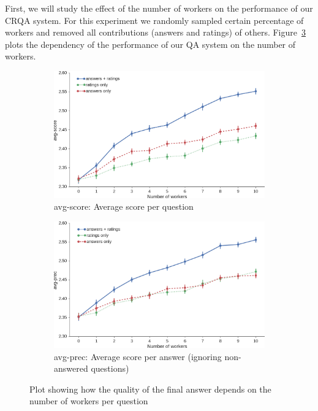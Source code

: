 \documentclass[letterpaper]{article}
\begin{document}
First, we will study the effect of the number of workers on the performance of our CRQA system.
For this experiment we randomly sampled certain percentage of workers and removed all contributions (answers and ratings) of others.
Figure~\ref{fig:nworkers_vs_quality} plots the dependency of the performance of our QA system on the number of workers.

\begin{figure}[h!t]
  \begin{subfigure}[t]{0.48\textwidth}
	\centering
	\includegraphics[width=\textwidth]{img/nworkers_vs_accuracy}
	\caption{avg-score: Average score per question}
	\label{fig:nworkers_vs_accuracy}
  \end{subfigure}
  \begin{subfigure}[t]{0.48\textwidth}
	\centering
	\includegraphics[width=\textwidth]{img/nworkers_vs_precision}
	\caption{avg-prec: Average score per answer (ignoring non-answered questions)}
	\label{fig:nworkers_vs_precision}
  \end{subfigure}
	\caption{Plot showing how the quality of the final answer depends on the number of workers per question}
	\label{fig:nworkers_vs_quality}
\end{figure}
\end{document}
